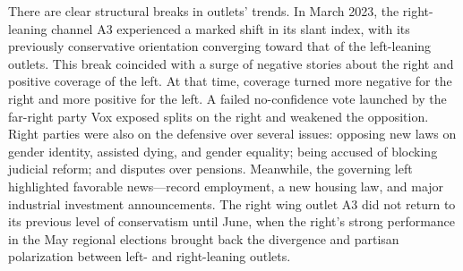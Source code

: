 \documentclass[12pt]{article}
\begin{document}
	
	
	There are clear structural breaks in outlets’ trends. In March 2023, the right-leaning channel A3 experienced a marked shift in its slant index, with its previously conservative orientation converging toward that of the left-leaning outlets. This break coincided with a surge of negative stories about the right and positive coverage of the left. At that time, coverage turned more negative for the right and more positive for the left. A failed no-confidence vote launched by the far-right party Vox exposed splits on the right and weakened the opposition. Right parties were also on the defensive over several issues: opposing new laws on gender identity, assisted dying, and gender equality; being accused of blocking judicial reform; and disputes over pensions. Meanwhile, the governing left highlighted favorable news—record employment, a new housing law, and major industrial investment announcements. The right wing outlet A3 did not return to its previous level of conservatism until June, when the right’s strong performance in the May regional elections brought back the  divergence and partisan polarization between left- and right-leaning outlets. 
	
	
	
\end{document}
